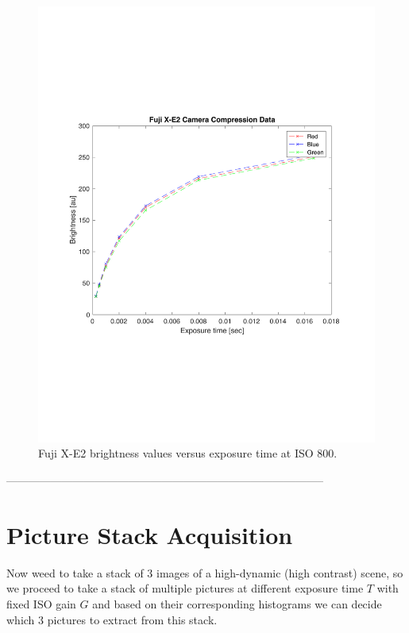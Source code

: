 \documentclass[a4paper]{article}
\begin{document}
\begin{figure}[htb!]
    \begin{center}
        \includegraphics[width=6 in]{Ecal.pdf}
	 \end{center}
    \caption{Fuji X-E2 brightness values versus exposure time at ISO 800.} 
    \label{fig:Ecal}
\end{figure}
\FloatBarrier--------------------------------------------------------------------------------------
\section{Picture Stack Acquisition}
Now weed to take a stack of 3 images of a high-dynamic (high contrast) scene, so we proceed to take a stack of multiple pictures at different exposure time $T$ with fixed ISO gain $G$ and based on their corresponding histograms we can decide which 3 pictures to extract from this stack.
\end{document}
